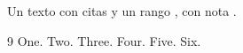 \documentclass{article}
\begin{document}
Un texto con citas \cite{b,a} y un rango \cite{c,a,b}, con nota \cite[p\'ag.~5]{e,a}.

\begin{thebibliography}{9}
 One.
 Two.
 Three.
 Four.
 Five.
 Six.
\end{thebibliography}
\end{document}
